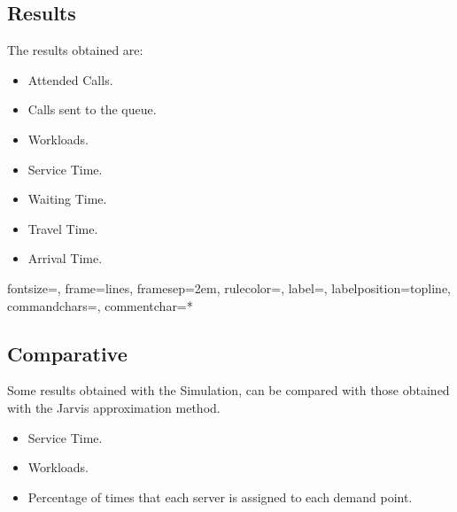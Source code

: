 \subsection{Results}
\begin{frame}
  The results obtained are:
  \begin{itemize}
  \item Attended Calls.
  \item Calls sent to the queue.
  \item Workloads.
  \item Service Time.
  \item Waiting Time.
  \item Travel Time.
  \item Arrival Time.
  \end{itemize}
\end{frame}

{}%
{fontsize=\footnotesize,
 frame=lines,  %
 framesep=2em, %
 rulecolor=\color{Gray},
 label=,
 labelposition=topline,
 commandchars=\|\(\), %
 commentchar=*        %
}

\begin{frame}
\end{frame}

\subsection{Comparative}
\begin{frame}
  Some results obtained with the Simulation,
  can be compared with those obtained with the Jarvis approximation method. 
  \begin{itemize}
  \item Service Time.
  \item Workloads.
  \item Percentage of times that each server is assigned to each demand point.
  \end{itemize}
\end{frame}
